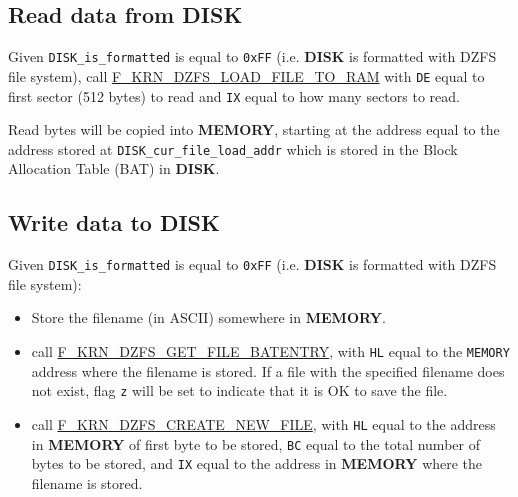 \documentclass[a4paper,11pt]{article}
\begin{document}
    \subsection{Read data from DISK}
    Given \texttt{DISK\_is\_formatted} is equal to \texttt{0xFF} (i.e.
    \textbf{DISK} is formatted with DZFS file system), call
    \hyperref[func:fkrndzfsloadfiletoram]{F\_KRN\_DZFS\_LOAD\_FILE\_TO\_RAM}
    with \texttt{DE} equal to first sector (512 bytes) to read and \texttt{IX}
    equal to how many sectors to read.

    Read bytes will be copied into \textbf{MEMORY}, starting at the address 
    equal to the address stored at \texttt{DISK\_cur\_file\_load\_addr} which is
    stored in the Block Allocation Table (BAT) in \textbf{DISK}.

    \subsection{Write data to DISK}
    Given \texttt{DISK\_is\_formatted} is equal to \texttt{0xFF} (i.e.
    \textbf{DISK} is formatted with DZFS file system):

    \begin{itemize}
        \item Store the filename (in ASCII) somewhere in \textbf{MEMORY}.
        \item call \hyperref[func:fkrndzfsgetfilebatentry]{F\_KRN\_DZFS\_GET\_FILE\_BATENTRY},
            with \texttt{HL} equal to the \texttt{MEMORY} address where the
            filename is stored. If a file with the specified filename does not
            exist, flag \texttt{z} will be set to indicate that it is OK to save
            the file.
        \item call \hyperref[func:fkrndzfscreatenewfile]{F\_KRN\_DZFS\_CREATE\_NEW\_FILE},
            with \texttt{HL} equal to the address in \textbf{MEMORY} of first
            byte to be stored, \texttt{BC} equal to the total number of bytes to
            be stored, and \texttt{IX} equal to the address in \textbf{MEMORY}
            where the filename is stored.
    \end{itemize}

\end{document}
